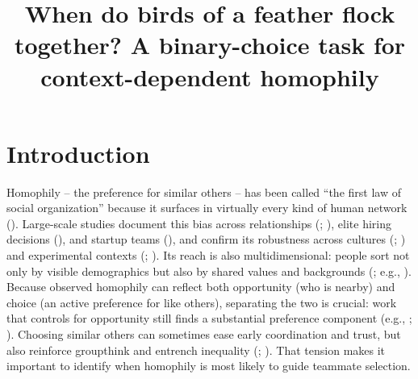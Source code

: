 \documentclass[
  man,
  floatsintext,
  longtable,
  nolmodern,
  notxfonts,
  notimes,
  draftfirst,
  colorlinks=true,linkcolor=blue,citecolor=blue,urlcolor=blue]{apa7}
\title{When do birds of a feather flock together? A binary-choice task
for context-dependent homophily}
\begin{document}
\maketitle


\setcounter{secnumdepth}{-\maxdimen} %

\setlength\LTleft{0pt}


\section{Introduction}\label{introduction}

Homophily -- the preference for similar others -- has been called ``the
first law of social organization'' because it surfaces in virtually
every kind of human network (). Large-scale studies document this bias across
relationships (; ),
elite hiring decisions (),
and startup teams (),
and confirm its robustness across cultures
(;
) and
experimental contexts (; ). Its
reach is also multidimensional: people sort not only by visible
demographics but also by shared values and backgrounds
(; e.g.,
). Because
observed homophily can reflect both opportunity (who is nearby) and
choice (an active preference for like others), separating the two is
crucial: work that controls for opportunity still finds a substantial
preference component (e.g.,
;
). Choosing similar others
can sometimes ease early coordination and trust, but also reinforce
groupthink and entrench inequality (; ).
That tension makes it important to identify when homophily is most
likely to guide teammate selection.
\end{document}
